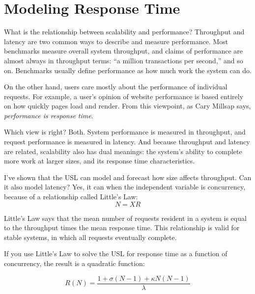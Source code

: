 \documentclass{vivid_layout}
\begin{document}
\section{Modeling Response Time}

What is the relationship between scalability and performance?  Throughput and
latency are two common ways to describe and measure performance. Most benchmarks
measure overall system throughput, and claims of performance are almost always
in throughput terms: ``a million transactions per second,'' and so on.
Benchmarks usually define performance as how much work the system can do.

On the other hand, users care mostly about the performance of individual
requests. For example, a user's opinion of website performance is based entirely on
how quickly pages load and render.  From this viewpoint, as Cary Millsap says,
{\itshape performance is response time}.

Which view is right? Both. System performance is measured in throughput, and
request performance is measured in latency. And because throughput and latency
are related, scalability also has dual meanings: the system's ability to
complete more work at larger sizes, and its response time characteristics.

I've shown that the USL can model and forecast how size affects throughput. Can
it also model latency? Yes, it can when the independent variable is concurrency,
because of a relationship called Little's Law:
\begin{equation}
N = X R
\label{littles_law}
\end{equation}

Little's Law says that the mean number of requests resident in a system is
equal to the throughput times the mean response time. This relationship is
valid for stable systems, in which all requests eventually complete.

If you use Little's Law to solve the USL for response time as a function of
concurrency, the result is a quadratic function:

\begin{equation}
R(N)=\frac{1+\sigma(N-1)+\kappa N(N-1)}{\lambda}
\label{r_n}
\end{equation}
\end{document}
